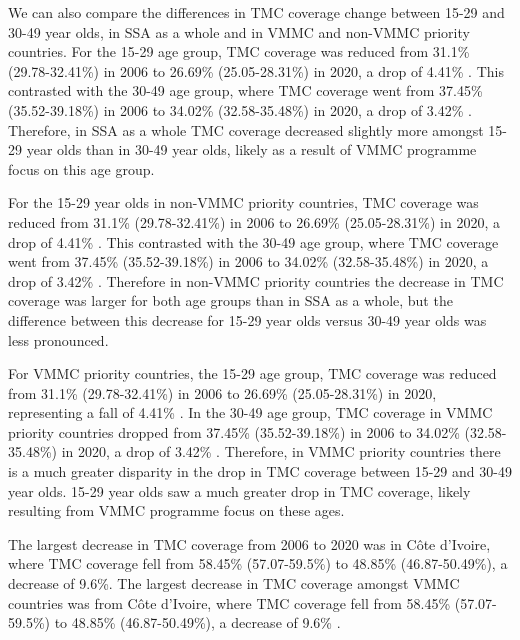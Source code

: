 \documentclass{article}
\begin{document}
We can also compare the differences in TMC coverage change between 15-29
and 30-49 year olds, in SSA as a whole and in VMMC and non-VMMC priority
countries. For the 15-29 age group, TMC coverage was reduced from 31.1\%
(29.78-32.41\%) in 2006 to 26.69\% (25.05-28.31\%) in 2020, a drop of
4.41\% . This contrasted with the 30-49 age group, where TMC coverage
went from 37.45\% (35.52-39.18\%) in 2006 to 34.02\% (32.58-35.48\%) in
2020, a drop of 3.42\% . Therefore, in SSA as a whole TMC coverage
decreased slightly more amongst 15-29 year olds than in 30-49 year olds,
likely as a result of VMMC programme focus on this age group.

For the 15-29 year olds in non-VMMC priority countries, TMC coverage was
reduced from 31.1\% (29.78-32.41\%) in 2006 to 26.69\% (25.05-28.31\%)
in 2020, a drop of 4.41\% . This contrasted with the 30-49 age group,
where TMC coverage went from 37.45\% (35.52-39.18\%) in 2006 to 34.02\%
(32.58-35.48\%) in 2020, a drop of 3.42\% . Therefore in non-VMMC
priority countries the decrease in TMC coverage was larger for both age
groups than in SSA as a whole, but the difference between this decrease
for 15-29 year olds versus 30-49 year olds was less pronounced.

For VMMC priority countries, the 15-29 age group, TMC coverage was
reduced from 31.1\% (29.78-32.41\%) in 2006 to 26.69\% (25.05-28.31\%)
in 2020, representing a fall of 4.41\% . In the 30-49 age group, TMC
coverage in VMMC priority countries dropped from 37.45\% (35.52-39.18\%)
in 2006 to 34.02\% (32.58-35.48\%) in 2020, a drop of 3.42\% .
Therefore, in VMMC priority countries there is a much greater disparity
in the drop in TMC coverage between 15-29 and 30-49 year olds. 15-29
year olds saw a much greater drop in TMC coverage, likely resulting from
VMMC programme focus on these ages.

The largest decrease in TMC coverage from 2006 to 2020 was in Côte
d'Ivoire, where TMC coverage fell from 58.45\% (57.07-59.5\%) to 48.85\%
(46.87-50.49\%), a decrease of 9.6\%. The largest decrease in TMC
coverage amongst VMMC countries was from Côte d'Ivoire, where TMC
coverage fell from 58.45\% (57.07-59.5\%) to 48.85\% (46.87-50.49\%), a
decrease of 9.6\% .


\end{document}
